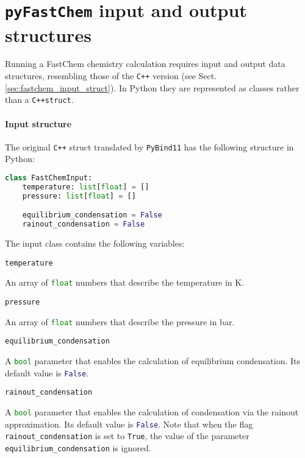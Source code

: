 \documentclass[numbers=noenddot]{aux/fcmanual}
\newcommand{\pfc}{\texttt{pyFastChem}\xspace}
\newcommand{\cpp}{\ttt{C++}\xspace}
\newcommand{\pb}{\texttt{PyBind11}\xspace}
\newcommand{\ttt}[1]{\texttt {#1}}
\begin{document}
\pagebreak

\section{\pfc input and output structures}
\label{sec:pfc_input_ouput_struct}

Running a FastChem chemistry calculation requires input and output data structures, resembling those of the \cpp version (see Sect. \ref{sec:fastchem_input_struct}). In Python they are represented as classes rather than a \cpp \lstinline!struct!.

\paragraph{Input structure}

The original \cpp struct translated by \pb has the following structure in Python:
\bigbreak
\begin{lstlisting}[language=Python]
  class FastChemInput:
    temperature: list[float] = []
    pressure: list[float] = []

    equilibrium_condensation = False
    rainout_condensation = False
\end{lstlisting}
\bigbreak

The input class contains the following variables:

\bigbreak

\lstinline[language=Python]!temperature!
\begin{addmargin}[25pt]{0pt}
	An array of \lstinline[language=Python]!float! numbers that describe the temperature in K.
\end{addmargin}

\bigbreak

\lstinline[language=Python]!pressure!
\begin{addmargin}[25pt]{0pt}
	An array of \lstinline[language=Python]!float! numbers that describe the pressure in bar.
\end{addmargin}

\bigbreak

\lstinline[language=Python]!equilibrium_condensation!
\begin{addmargin}[25pt]{0pt}
	A \lstinline[language=Python]!bool! parameter that enables the calculation of equilibrium condensation. Its default value is  \lstinline[language=Python]!False!.
\end{addmargin}

\bigbreak

\lstinline[language=Python]!rainout_condensation!
\begin{addmargin}[25pt]{0pt}
	A \lstinline[language=Python]!bool! parameter that enables the calculation of condensation via the rainout approximation. Its default value is \lstinline[language=Python]!False!. Note that when the flag \lstinline!rainout_condensation! is set to \lstinline!True!, the value of the parameter \lstinline!equilibrium_condensation! is ignored.
\end{addmargin}
\end{document}
